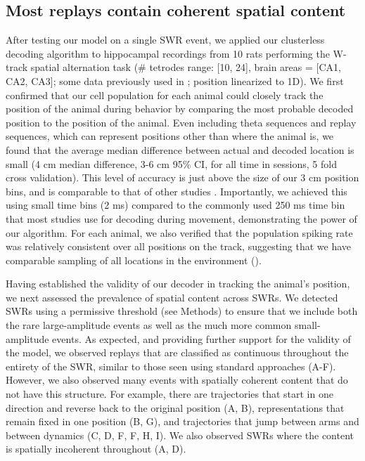 \documentclass[9pt,lineno]{elife}
\begin{document}
\subsection*{Most replays contain coherent spatial content}
After testing our model on a single SWR event, we applied our clusterless decoding algorithm to hippocampal recordings from 10 rats performing the W-track spatial alternation task (\# tetrodes range: [10, 24], brain areas = [CA1, CA2, CA3]; some data previously used in \cite{KarlssonAwakereplayremote2009, KayConstantSubsecondCycling2020, CarrTransientSlowGamma2012}; position linearized to 1D). We first confirmed that our cell population for each animal could closely track the position of the animal during behavior by comparing the most probable decoded position to the position of the animal. Even including theta sequences and replay sequences, which can represent positions other than where the animal is, we found that the average median difference between actual and decoded location is small (4 cm median difference, 3-6 cm 95\% CI, for all time in sessions, 5 fold cross validation). This level of accuracy is just above the size of our 3 cm position bins, and is comparable to that of other studies \citep{DavidsonHippocampalReplayExtended2009, ShinDynamicsAwakeHippocampalPrefrontal2019, FarooqEmergencepreconfiguredplastic2019}. Importantly, we achieved this using small time bins (2 ms) compared to the commonly used 250 ms time bin that most studies use for decoding during movement, demonstrating the power of our algorithm. For each animal, we also verified that the population spiking rate was relatively consistent over all positions on the track, suggesting that we have comparable sampling of all locations in the environment ().

Having established the validity of our decoder in tracking the animal's position, we next assessed the prevalence of spatial content across SWRs. We detected SWRs using a permissive threshold (see Methods) to ensure that we include both the rare large-amplitude events as well as the much more common small-amplitude events. As expected, and providing further support for the validity of the model, we observed replays that are classified as continuous throughout the entirety of the SWR, similar to those seen using standard approaches (A-F). However, we also observed many events with spatially coherent content that do not have this structure. For example, there are trajectories that start in one direction and reverse back to the original position (A, B), representations that remain fixed in one position (B, G), and trajectories that jump between arms and between dynamics (C, D, F, F, H, I). We also observed SWRs where the content is spatially incoherent throughout (A, D).
\end{document}
